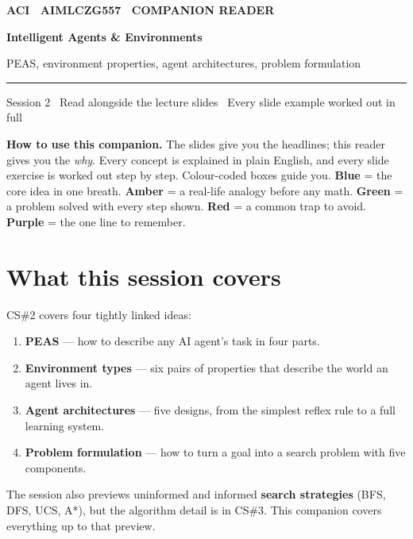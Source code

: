 \documentclass[a4paper,11pt]{article}
\providecommand{\addfontfeatureslike}[1]{#1}
\newcommand{\titlebanner}[4]{%
  \begin{tcolorbox}[
    enhanced, breakable=false,
    colback=navy, colframe=navy,
    boxrule=0pt, arc=3pt, outer arc=3pt,
    left=16pt, right=16pt, top=16pt, bottom=16pt,
    before skip=2pt, after skip=14pt,
    width=\linewidth ]
    {\sffamily\footnotesize\bfseries\color{white!85}%
      \MakeUppercase{\addfontfeatureslike{#1}}}\par
    \vspace{6pt}
    {\sffamily\bfseries\fontsize{30}{34}\selectfont\color{white} #2\par}
    \vspace{5pt}
    {\sffamily\large\color{white!88} #3\par}
    \vspace{9pt}
    {\color{white!55}\rule{\linewidth}{0.4pt}}\par
    \vspace{6pt}
    {\sffamily\footnotesize\color{white!82} #4\par}
  \end{tcolorbox}%
}
\newcommand{\vocab}[1]{\textbf{\color{navy}#1}}
\begin{document}

\thispagestyle{fancy}

\titlebanner
  {ACI \textperiodcentered\ AIMLCZG557 \textperiodcentered\ Companion Reader}
  {Intelligent Agents \& Environments}
  {PEAS, environment properties, agent architectures, problem formulation}
  {Session 2 \textperiodcentered\ Read alongside the lecture slides \textperiodcentered\ Every slide example worked out in full}

\noindent\textbf{How to use this companion.}
The slides give you the headlines; this reader gives you the \emph{why}.
Every concept is explained in plain English, and every slide exercise is worked
out step by step.
Colour-coded boxes guide you.
\textcolor{intuFrame}{\textbf{Blue}} = the core idea in one breath.
\textcolor{everyFrame}{\textbf{Amber}} = a real-life analogy before any math.
\textcolor{workFrame}{\textbf{Green}} = a problem solved with every step shown.
\textcolor{watchFrame}{\textbf{Red}} = a common trap to avoid.
\textcolor{keyFrame}{\textbf{Purple}} = the one line to remember.

\medskip

\section{What this session covers}

CS\#2 covers four tightly linked ideas:

\begin{enumerate}
  \item \textbf{PEAS} --- how to describe any AI agent's task in four parts.
  \item \textbf{Environment types} --- six pairs of properties that describe
        the world an agent lives in.
  \item \textbf{Agent architectures} --- five designs, from the simplest
        reflex rule to a full learning system.
  \item \textbf{Problem formulation} --- how to turn a goal into a search problem
        with five components.
\end{enumerate}

The session also previews uninformed and informed \vocab{search strategies}
(BFS, DFS, UCS, A*), but the algorithm detail is in CS\#3.
This companion covers everything up to that preview.
\end{document}
